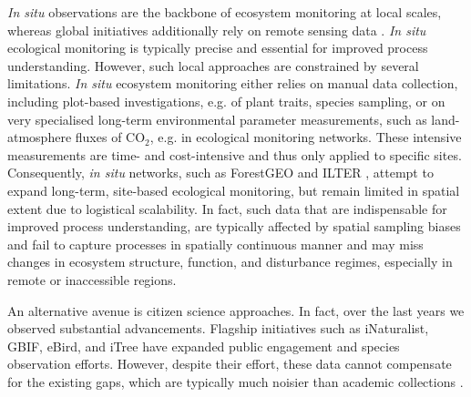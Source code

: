 \documentclass[pdflatex,sn-mathphys-num]{sn-jnl}%
\theoremstyle{thmstyleone}%
\theoremstyle{thmstyletwo}%
\theoremstyle{thmstylethree}%
\begin{document}
\textit{In situ} observations are the backbone of ecosystem monitoring at local scales, whereas global initiatives additionally rely on remote sensing data \cite{balsamo2018satellite}. \textit{In situ} ecological monitoring is typically precise and essential for improved process understanding. However, such local approaches are constrained by several limitations. \textit{In situ} ecosystem monitoring either relies on manual data collection, including plot-based investigations, e.g. of plant traits, species sampling, or on very specialised long-term environmental parameter measurements, such as land-atmosphere fluxes of CO$_2$, e.g. in ecological monitoring networks. These intensive measurements are time- and cost-intensive and thus only applied to specific sites. Consequently, \textit{in situ} networks, such as ForestGEO \cite{anderson2015ctfs} and ILTER \cite{mirtl2018genesis}, attempt to expand long-term, site-based ecological monitoring, but remain limited in spatial extent due to logistical scalability\cite{magurran2010long}. In fact, such data that are indispensable for improved process understanding, are typically affected by spatial sampling biases \cite{verheyen2012driving, mahecha2017detecting} and fail to capture processes in spatially continuous manner and may miss changes in ecosystem structure, function, and disturbance regimes, especially in remote or inaccessible regions. %

An alternative avenue is citizen science approaches. In fact, over the last years we observed substantial advancements. Flagship initiatives such as iNaturalist, GBIF, eBird, and iTree have expanded public engagement and species observation efforts. However, despite their effort, these data cannot compensate for the existing gaps, which are typically much noisier than academic collections \cite{bonney2021expanding,schiller2021deep}.
\end{document}
